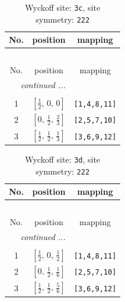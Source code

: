 \documentclass[fleqn,8pt]{jsarticle}
\begin{document}
\renewcommand{\arraystretch}{1.2}
\begin{longtable}{ccc}
\caption{Wyckoff site: {\tt 3c}, site symmetry: {\tt 222}}
 \\
 \hline \hline
No. & position & mapping \\ \hline \endfirsthead

\multicolumn{2}{l}{\tablename\ \thetable{}} \\
 \hline \hline
No. & position & mapping \\ \hline \endhead

 \hline \hline
\multicolumn{2}{r}{\footnotesize\it continued ...} \\ \endfoot

 \hline \hline
\multicolumn{2}{r}{} \\ \endlastfoot

1 & $\left[ \frac{1}{2},\, 0,\, 0 \right]$ & {\tt [1,4,8,11]} \\ \hline
2 & $\left[ 0,\, \frac{1}{2},\, \frac{2}{3} \right]$ & {\tt [2,5,7,10]} \\ \hline
3 & $\left[ \frac{1}{2},\, \frac{1}{2},\, \frac{1}{3} \right]$ & {\tt [3,6,9,12]} \\
\end{longtable}
\renewcommand{\arraystretch}{1.2}
\begin{longtable}{ccc}
\caption{Wyckoff site: {\tt 3d}, site symmetry: {\tt 222}}
 \\
 \hline \hline
No. & position & mapping \\ \hline \endfirsthead

\multicolumn{2}{l}{\tablename\ \thetable{}} \\
 \hline \hline
No. & position & mapping \\ \hline \endhead

 \hline \hline
\multicolumn{2}{r}{\footnotesize\it continued ...} \\ \endfoot

 \hline \hline
\multicolumn{2}{r}{} \\ \endlastfoot

1 & $\left[ \frac{1}{2},\, 0,\, \frac{1}{2} \right]$ & {\tt [1,4,8,11]} \\ \hline
2 & $\left[ 0,\, \frac{1}{2},\, \frac{1}{6} \right]$ & {\tt [2,5,7,10]} \\ \hline
3 & $\left[ \frac{1}{2},\, \frac{1}{2},\, \frac{5}{6} \right]$ & {\tt [3,6,9,12]} \\
\end{longtable}
\renewcommand{\arraystretch}{1.2}
\end{document}

